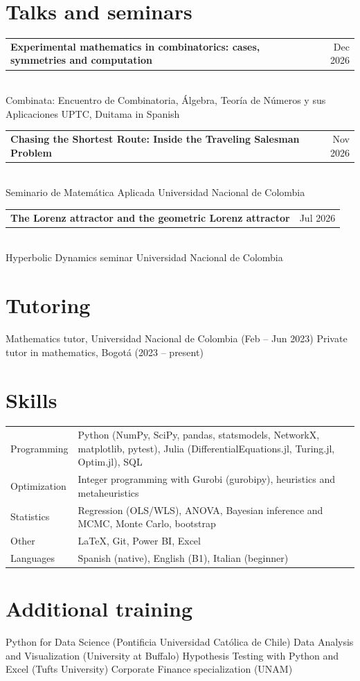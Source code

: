 \documentclass[11pt,a4paper]{article}
\makeatletter
\newcommand{\entry}[3]{%
  \begin{tabularx}{\textwidth}{@{}>{\raggedright\arraybackslash}X@{\hspace{1em}}r@{}}
    \textbf{#1} & {\color{gris}#2}
  \end{tabularx}\\
  {\color{gris}\small #3}\par\vspace{2pt}}
\makeatother
\begin{document}
\section{Talks and seminars}
\entry{Experimental mathematics in combinatorics: cases, symmetries and computation}{Dec 2026}{Combinata:
  Encuentro de Combinatoria, \'Algebra, Teor\'ia de N\'umeros y sus Aplicaciones \textperiodcentered{}
  UPTC, Duitama \textperiodcentered{} in Spanish}
\entry{Chasing the Shortest Route: Inside the Traveling Salesman Problem}{Nov 2026}{Seminario de
  Matem\'atica Aplicada \textperiodcentered{} Universidad Nacional de Colombia}
\entry{The Lorenz attractor and the geometric Lorenz attractor}{Jul 2026}{Hyperbolic Dynamics
  seminar \textperiodcentered{} Universidad Nacional de Colombia}

\section{Tutoring}
Mathematics tutor, Universidad Nacional de Colombia (Feb -- Jun 2023) \textperiodcentered{}
Private tutor in mathematics, Bogot\'a (2023 -- present)

\section{Skills}
\begin{tabularx}{\textwidth}{@{}p{3.2cm}X@{}}
  Programming & Python (NumPy, SciPy, pandas, statsmodels, NetworkX, matplotlib, pytest),
                Julia (DifferentialEquations.jl, Turing.jl, Optim.jl), SQL \\
  Optimization & Integer programming with Gurobi (gurobipy), heuristics and metaheuristics \\
  Statistics & Regression (OLS/WLS), ANOVA, Bayesian inference and MCMC, Monte Carlo, bootstrap \\
  Other & \LaTeX, Git, Power BI, Excel \\
  Languages & Spanish (native), English (B1), Italian (beginner)
\end{tabularx}

\section{Additional training}
Python for Data Science (Pontificia Universidad Cat\'olica de Chile) \textperiodcentered{}
Data Analysis and Visualization (University at Buffalo) \textperiodcentered{}
Hypothesis Testing with Python and Excel (Tufts University) \textperiodcentered{}
Corporate Finance specialization (UNAM)
\end{document}
